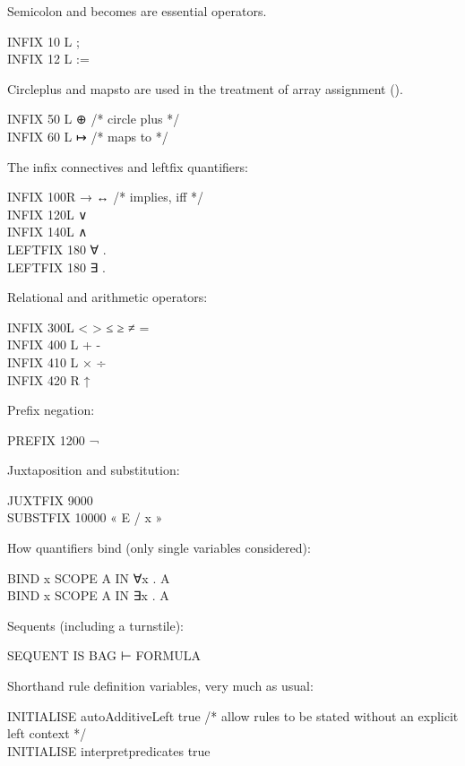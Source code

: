 Semicolon and becomes are essential operators.
\begin{japeish}
INFIX 10 L ; \\
INFIX 12 L :=
\end{japeish}

Circleplus and mapsto are used in the treatment of array assignment ().
\begin{japeish}
INFIX 50 L ⊕ /* circle plus */ \\
INFIX 60 L ↦ /* maps to */
\end{japeish}

The infix connectives and leftfix quantifiers:
\begin{japeish}
INFIX   100R    → ↔ /* implies, iff */ \\
INFIX   120L    ∨ \\
INFIX   140L    ∧ \\
LEFTFIX 180 ∀ . \\
LEFTFIX 180 ∃ .
\end{japeish}

Relational and arithmetic operators:
\begin{japeish}
INFIX   300L    <   >   ≤   ≥   ≠   =  \\
INFIX   400 L   + - \\
INFIX   410 L   × ÷ \\
INFIX   420 R   ↑
\end{japeish}

Prefix negation:
\begin{japeish}
PREFIX  1200    ¬
\end{japeish}

Juxtaposition and substitution:
\begin{japeish}
JUXTFIX     9000 \\
SUBSTFIX    10000   « E / x  »
\end{japeish}

How quantifiers bind (only single variables considered):
\begin{japeish}
BIND x SCOPE A IN ∀x . A \\
BIND x SCOPE A IN ∃x . A
\end{japeish}

Sequents (including a turnstile):
\begin{japeish}
SEQUENT IS BAG ⊢ FORMULA
\end{japeish}

Shorthand rule definition variables, very much as usual:
\begin{japeish}
INITIALISE autoAdditiveLeft true /* allow rules to be stated without an explicit left context */ \\
INITIALISE interpretpredicates true
\end{japeish}

